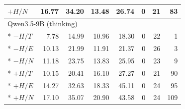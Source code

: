 \begin{longtable}{@{}lrrrrrrr@{}}
$+H/N$ & 16.77 & 34.20 & 13.48 & 26.74 & 0 & 21 & 83 \\
\midrule
\multicolumn{8}{l}{Qwen3.5-9B (thinking)} \\*
\addlinespace
$-H/T$ & 7.78 & 14.99 & 10.96 & 18.30 & 0 & 22 & 1 \\*
$-H/E$ & 10.13 & 21.99 & 11.91 & 21.37 & 0 & 26 & 3 \\*
$-H/N$ & 11.18 & 23.75 & 13.83 & 25.95 & 0 & 23 & 9 \\*
$+H/T$ & 10.15 & 20.41 & 16.10 & 27.27 & 0 & 21 & 90 \\*
$+H/E$ & 14.27 & 32.63 & 18.33 & 45.11 & 0 & 24 & 95 \\*
$+H/N$ & 17.10 & 35.07 & 20.90 & 43.58 & 0 & 24 & 109 \\
\end{longtable}
\endgroup
